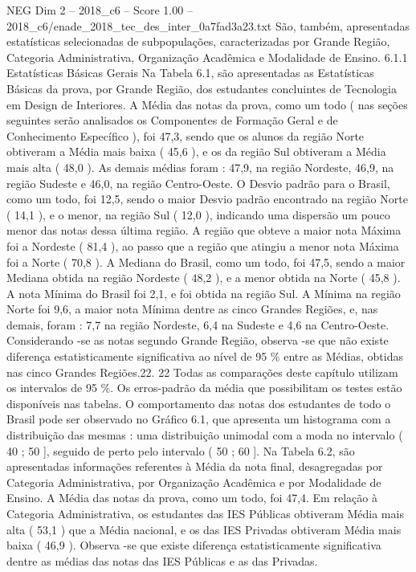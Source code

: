 \begin{textsample}{NEG Dim 2 – 2018\_c6 – Score 1.00 – 2018\_c6/enade\_2018\_tec\_des\_inter\_0a7fad3a23.txt}
São, também, apresentadas estatísticas selecionadas de subpopulações, caracterizadas por Grande Região, Categoria Administrativa, Organização Acadêmica e Modalidade de Ensino. 6.1.1 Estatísticas Básicas Gerais Na Tabela 6.1, são apresentadas as Estatísticas Básicas da prova, por Grande Região, dos estudantes concluintes de Tecnologia em Design de Interiores.
A Média das notas da prova, como um todo ( nas seções seguintes serão analisados os Componentes de Formação Geral e de Conhecimento Específico ), foi 47,3, sendo que os alunos da região Norte obtiveram a Média mais baixa ( 45,6 ), e os da região Sul obtiveram a Média mais alta ( 48,0 ).
As demais médias foram : 47,9, na região Nordeste, 46,9, na região Sudeste e 46,0, na região Centro-Oeste.
O Desvio padrão para o Brasil, como um todo, foi 12,5, sendo o maior Desvio padrão encontrado na região Norte ( 14,1 ), e o menor, na região Sul ( 12,0 ), indicando uma dispersão um pouco menor das notas dessa última região.
A região que obteve a maior nota Máxima foi a Nordeste ( 81,4 ), ao passo que a região que atingiu a menor nota Máxima foi a Norte ( 70,8 ).
A Mediana do Brasil, como um todo, foi 47,5, sendo a maior Mediana obtida na região Nordeste ( 48,2 ), e a menor obtida na Norte ( 45,8 ).
A nota Mínima do Brasil foi 2,1, e foi obtida na região Sul.
A Mínima na região Norte foi 9,6, a maior nota Mínima dentre as cinco Grandes Regiões, e, nas demais, foram : 7,7 na região Nordeste, 6,4 na Sudeste e 4,6 na Centro-Oeste.
Considerando -se as notas segundo Grande Região, observa -se que não existe diferença estatisticamente significativa ao nível de 95 \% entre as Médias, obtidas nas cinco Grandes Regiões.22. 22 Todas as comparações deste capítulo utilizam os intervalos de 95 \%.
Os erros-padrão da média que possibilitam os testes estão disponíveis nas tabelas.
O comportamento das notas dos estudantes de todo o Brasil pode ser observado no Gráfico 6.1, que apresenta um histograma com a distribuição das mesmas : uma distribuição unimodal com a moda no intervalo ( 40 ; 50 ], seguido de perto pelo intervalo ( 50 ; 60 ].
Na Tabela 6.2, são apresentadas informações referentes à Média da nota final, desagregadas por Categoria Administrativa, por Organização Acadêmica e por Modalidade de Ensino.
A Média das notas da prova, como um todo, foi 47,4.
Em relação à Categoria Administrativa, os estudantes das IES Públicas obtiveram Média mais alta ( 53,1 ) que a Média nacional, e os das IES Privadas obtiveram Média mais baixa ( 46,9 ).
Observa -se que existe diferença estatisticamente significativa dentre as médias das notas das IES Públicas e as das Privadas.

\end{textsample}
